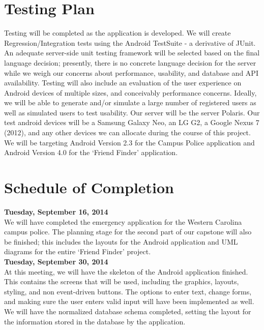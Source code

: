 \documentclass[11pt]{article}
\begin{document}
\section{Testing Plan}

    Testing will be completed as the application is developed. We will create 
    Regression/Integration tests using the Android TestSuite - a derivative of 
    JUnit. An adequate server-side unit testing framework will be selected 
    based on the final language decision; presently, there is no concrete 
    language decision for the server while we weigh our concerns about 
    performance, usability, and database and API availability.  Testing will 
    also include an evaluation of the user experience on Android devices 
    of multiple sizes, and conceivably performance concerns. Ideally, we will be
    able to generate and/or simulate a large number of registered users as well
    as simulated users to test usability. Our server will be the server Polaris. 
    Our test android devices will be a Samsung Galaxy Neo, an LG G2, 
    a Google Nexus 7 (2012), and any other devices we can allocate during 
    the course of this project. We will be targeting Android Version 2.3 for 
    the Campus Police application and Android Version 4.0 for the `Friend 
    Finder' application.

\section{Schedule of Completion}

\textbf{Tuesday, September 16, 2014}
\\
\indent We will have completed the emergency application for the Western 
Carolina campus police. The planning stage for the second part of our capstone
will also be finished; this includes the layouts for the Android application
and UML diagrams for the entire `Friend Finder' project.\\


\textbf{Tuesday, September 30, 2014}
\\  \indent  At this meeting, we will have the skeleton of the Android application 
    finished. This contains the screens that will be used, including the 
    graphics, layouts, styling, and non event-driven buttons. The options to 
    enter text, change forms, and making sure the user enters valid input will 
    have been implemented as well. We will have the normalized database schema 
    completed, setting the layout for the information stored in the database by
    the application. \\
\end{document}
